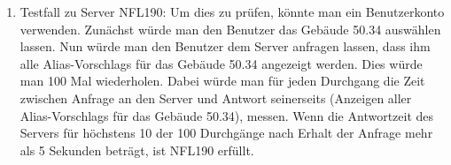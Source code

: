 \begin{enumerate}[label=\textbf{/T\arabic*0/}, align=left]
	\item Testfall zu Server NFL190: Um dies zu prüfen, könnte man ein \Gls{Benutzer}konto verwenden. Zunächst würde man den \Gls{Benutzer} das Gebäude 50.34 auswählen lassen. Nun würde man den \Gls{Benutzer} dem \Gls{Server} anfragen lassen, dass ihm alle \Glspl{Alias-Vorschlag} für das Gebäude 50.34 angezeigt werden. Dies würde man 100 Mal wiederholen. Dabei würde man für jeden Durchgang die Zeit zwischen Anfrage an den \Gls{Server} und Antwort seinerseits (Anzeigen aller \Glspl{Alias-Vorschlag} für das Gebäude 50.34), messen. Wenn die Antwortzeit des \Gls{Server}s für höchstens 10 der 100 Durchgänge nach Erhalt der Anfrage mehr als 5 Sekunden beträgt, ist NFL190 erfüllt.
\end{enumerate}